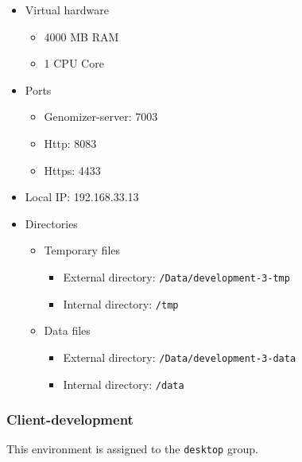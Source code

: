 \begin{itemize}
\itemsep1pt\parskip0pt
\item
  Virtual hardware

  \begin{itemize}
  \itemsep1pt\parskip0pt
  \item
    4000 MB RAM
  \item
    1 CPU Core
  \end{itemize}
\item
  Ports

  \begin{itemize}
  \itemsep1pt\parskip0pt
  \item
    Genomizer-server: 7003
  \item
    Http: 8083
  \item
    Https: 4433
  \end{itemize}
\item
  Local IP: 192.168.33.13
\item
  Directories

  \begin{itemize}
  \itemsep1pt\parskip0pt
  \item
    Temporary files

    \begin{itemize}
    \itemsep1pt\parskip0pt
    \item
      External directory: \texttt{/Data/development-3-tmp}
    \item
      Internal directory: \texttt{/tmp}
    \end{itemize}
  \item
    Data files

    \begin{itemize}
    \itemsep1pt\parskip0pt
    \item
      External directory: \texttt{/Data/development-3-data}
    \item
      Internal directory: \texttt{/data}
    \end{itemize}
  \end{itemize}
\end{itemize}

\subsubsection{Client-development}\label{sec:client-development}

This environment is assigned to the \texttt{desktop} group.

